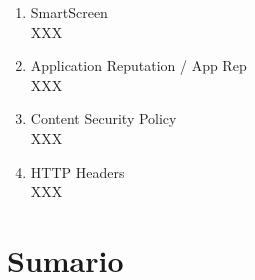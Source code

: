 \begin{enumerate}
        \item SmartScreen
        \\XXX
        
        \item Application Reputation / App Rep
        \\XXX


        \item Content Security Policy
        \\XXX


        \item HTTP Headers
        \\XXX

    \end{enumerate}






\section{Sumario}
\label{chap3:Summ}




